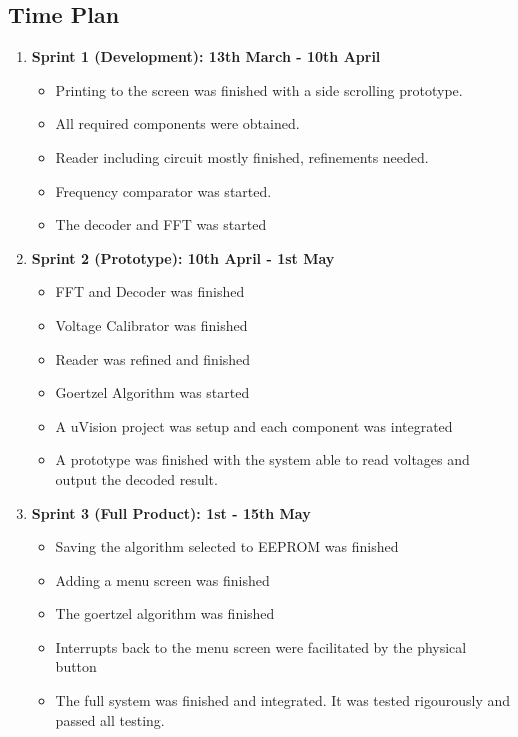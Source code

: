 \documentclass{cce2014-design}
\begin{document}
{  \subsection{Time Plan}
  {
	  \begin{enumerate}
		  \item \textbf{Sprint 1 (Development): 13th March - 10th
			        April}
		        \begin{itemize}
			        \item Printing to the screen was finished with
			              a side scrolling prototype.
			        \item All required components were obtained.
			        \item Reader including circuit mostly finished,
			              refinements needed.
			        \item Frequency comparator was started.
			        \item The decoder and FFT was started
		        \end{itemize}

		  \item \textbf{Sprint 2 (Prototype): 10th April - 1st
			        May}
		        \begin{itemize}
			        \item FFT and Decoder was finished
			        \item Voltage Calibrator was finished
			        \item Reader was refined and finished
			        \item Goertzel Algorithm was started
			        \item A uVision project was setup and
			              each component was integrated
			        \item A prototype was finished with the
			              system able to read voltages and output
			              the decoded result.
		        \end{itemize}

		  \item \textbf{Sprint 3 (Full Product): 1st - 15th May}
		        \begin{itemize}
			        \item Saving the algorithm selected to
			              EEPROM was finished
			        \item Adding a menu screen was finished
			        \item The goertzel algorithm was finished
			        \item Interrupts back to the menu
			              screen were facilitated by the physical
			              button
			        \item The full system was finished and
			              integrated. It was tested rigourously and
			              passed all testing.
		        \end{itemize}


\end{enumerate}}}
\end{document}
